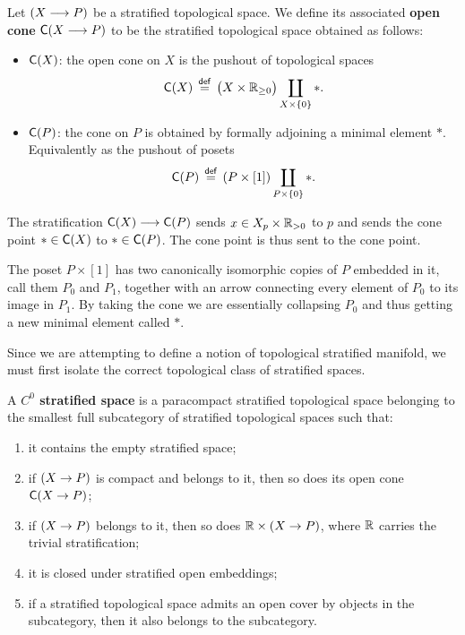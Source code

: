 \begin{definition}\label{ch4:: def: cones}
    Let $(X\longrightarrow P)$ be a stratified topological space. We define its associated \textbf{open cone} $\mathsf C(X \longrightarrow P)$ to be the stratified topological space obtained as follows: 
    \begin{itemize}
        \item $\mathsf C(X)$: the open cone on $X$ is the pushout of topological spaces
        \begin{equation}
            \mathsf C(X) \, \overset{\sf def}{=} \,  \big(X\times \mathbb R_{\geq 0}\big) \coprod_{X\times \{0\}} *.
        \end{equation}
        \item $\mathsf C(P)$: the cone on $P$ is obtained by formally adjoining a minimal element $*$. Equivalently as the pushout of posets
        \begin{equation}
            \mathsf C(P) \, \overset{\sf def}{=} \, (P \times [1]) \coprod_{P \times \{0\}} *.
        \end{equation}
    \end{itemize}
    The stratification $\mathsf C(X) \longrightarrow \mathsf C(P)$ sends $x \in X_{p} \times \mathbb R_{> 0}$ to $p$ and sends the cone point $* \in \mathsf C(X)$ to $*\in \mathsf C(P)$. The cone point is thus sent to the cone point.
\end{definition}

\begin{remark}
    The poset $P \times [1]$ has two canonically isomorphic copies of $P$ embedded in it, call them $P_0$ and $P_1$, together with an arrow connecting every element of $P_0$ to its image in $P_1$. By taking the cone we are essentially collapsing $P_0$ and thus getting a new minimal element called $*$.  
\end{remark}

Since we are attempting to define a notion of topological stratified manifold, we must first isolate the correct topological class of stratified spaces.
\begin{definition}\cite[Definition~2.1.15]{AFT1}
    A \textbf{$C^0$ stratified space} is a paracompact stratified topological space belonging to the smallest full subcategory of stratified topological spaces such that:
    \begin{enumerate}
        \item it contains the empty stratified space;
        \item if $(X \rightarrow P)$ is compact and belongs to it, then so does its open cone $\mathsf C(X \rightarrow P)$;
        \item if $(X \rightarrow P)$ belongs to it, then so does $\mathbb R \times (X \rightarrow P)$, where $\mathbb R$ carries the trivial stratification;
        \item it is closed under stratified open embeddings;
        \item if a stratified topological space admits an open cover by objects in the subcategory, then it also belongs to the subcategory.
    \end{enumerate}
\end{definition}

